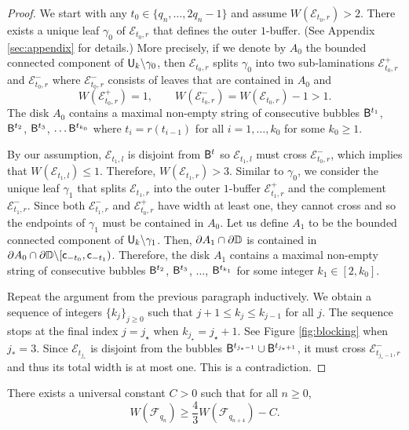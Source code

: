 \documentclass{amsart}
\begin{document}
\begin{proof}
    We start with any $t_0 \in \{q_n,\ldots, 2q_n-1\}$ and assume $W(\mathcal{E}_{t_0,r}) >2 $.
    There exists a unique leaf $\gamma_0$ of $\mathcal{E}_{t_0,r}$ that defines the outer $1$-buffer. 
    (See Appendix \ref{sec:appendix} for details.)
    More precisely, if we denote by $A_0$ the bounded connected component of $\mathsf{U}_k \backslash \gamma_0$, then $\mathcal{E}_{t_0,r}$ splits $\gamma_0$ into two sub-laminations $\mathcal{E}_{t_0,r}^+$ and $\mathcal{E}_{t_0,r}^-$ where $\mathcal{E}_{t_0,r}^-$ consists of leaves that are contained in $A_0$ and 
    \[
        W(\mathcal{E}_{t_0,r}^+) = 1, \qquad W(\mathcal{E}_{t_0,r}^-) = W(\mathcal{E}_{t_0,r}) -1 > 1.
    \]
    The disk $A_0$ contains a maximal non-empty string of consecutive bubbles $\mathsf{B}^{t_1}$, $\mathsf{B}^{t_2}$, $\mathsf{B}^{t_{3}}$, $\ldots \mathsf{B}^{t_{k_0}}$ where $t_{i}=r(t_{i-1})$ for all $i =1,\ldots, k_0$ for some $k_0 \geq 1$.
    
    By our assumption, $\mathcal{E}_{t_1,l}$ is disjoint from $\mathsf{B}^t$ so $\mathcal{E}_{t_1,l}$ must cross $\mathcal{E}_{t_0,r}^-$, which implies that $W(\mathcal{E}_{t_1,l}) \leq 1$. Therefore, $W(\mathcal{E}_{t_1,r}) > 3$. Similar to $\gamma_0$, we consider the unique leaf $\gamma_1$ that splits $\mathcal{E}_{t_1,r}$ into the outer $1$-buffer $\mathcal{E}_{t_1,r}^+$ and the complement $\mathcal{E}_{t_1,r}^-$. Since both $\mathcal{E}_{t_1,r}^-$ and $\mathcal{E}_{t_0,r}^+$ have width at least one, they cannot cross and so the endpoints of $\gamma_1$ must be contained in $A_0$. Let us define $A_1$ to be the bounded connected component of $\mathsf{U}_k \backslash \gamma_1$. Then, $\partial A_1 \cap \partial \mathbb{D} $ is contained in $\partial A_0 \cap \partial \mathbb{D} \backslash [\mathsf{c}_{-t_0},\mathsf{c}_{-t_1})$. Therefore, the disk $A_1$ contains a maximal non-empty string of consecutive bubbles $\mathsf{B}^{t_2}$, $\mathsf{B}^{t_3}$, $\ldots$, $\mathsf{B}^{t_{k_1}}$ for some integer $k_1 \in [2, k_0]$.

    Repeat the argument from the previous paragraph inductively. We obtain a sequence of integers $\{k_j\}_{j\geq 0}$ such that $j+1 \leq k_j \leq k_{j-1}$ for all $j$. 
    The sequence stops at the final index $j=j_\star$ when $k_{j_\star}=j_\star+1$. 
    See Figure \ref{fig:blocking} when $j_*=3$. 
    Since $\mathcal{E}_{t_{j_*}}$ is disjoint from the bubbles $\mathsf{B}^{t_{j_*-1}} \cup\mathsf{B}^{t_{j_*+1}}$, it must cross $\mathcal{E}_{t_{j_*-1},r}^-$ and thus its total width is at most one. This is a contradiction.
\end{proof}

\begin{theorem}[Amplification]
\label{thm:amplification}
    There exists a universal constant $C>0$ such that for all $n \geq 0$,
    \[
        W(\mathcal{F}_{q_{n}}) \geq \frac{4}{3} W(\mathcal{F}_{q_{n+4}}) - C.
    \]
\end{theorem}
\end{document}
